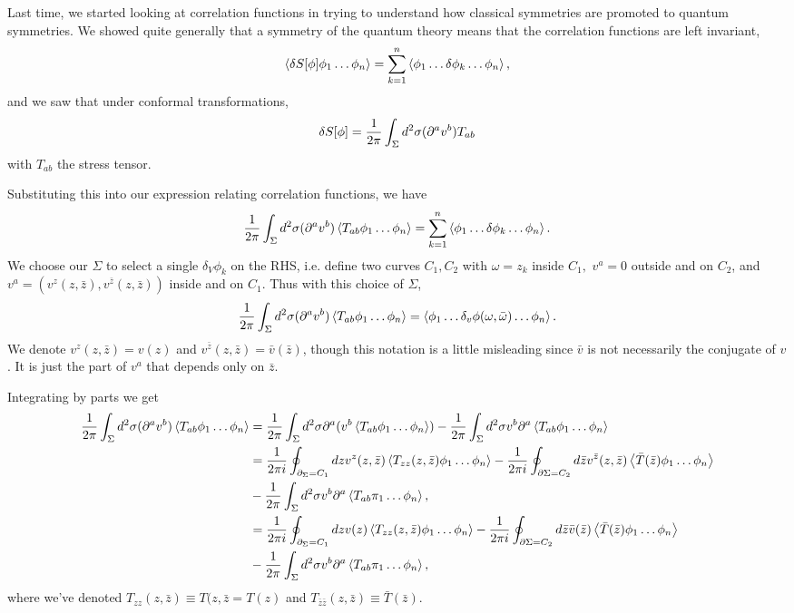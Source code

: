 Last time, we started looking at correlation functions in trying to understand how classical symmetries are promoted to quantum symmetries. We showed quite generally that a symmetry of the quantum theory means that the correlation functions are left invariant,
\begin{equation*}
    \left< \delta S[\phi]\phi_1\ldots \phi_n \right>=\sum_{k=1}^n \left< \phi_1 \ldots \delta \phi_k \ldots \phi_n \right>,
\end{equation*}
and we saw that under conformal transformations,
\begin{equation}
    \delta S[\phi]=\frac{1}{2\pi} \int_\Sigma d^2\sigma (\partial^a v^b)T_{ab}
\end{equation}
with $T_{ab}$ the stress tensor.

Substituting this into our expression relating correlation functions, we have
\begin{equation}
    \frac{1}{2\pi} \int_\Sigma d^2\sigma (\partial^a v^b) \left< T_{ab}\phi_1\ldots \phi_n \right>=\sum_{k=1}^n \left< \phi_1 \ldots \delta \phi_k \ldots \phi_n \right>.
\end{equation}
We choose our $\Sigma$ to select a single $\delta_V \phi_k$ on the RHS, i.e. define two curves $C_1,C_2$ with $\omega=z_k$ inside $C_1,$ $v^a=0$ outside and on $C_2$, and $v^a=(v^z(z,\bar z),v^{\bar z}(z,\bar z))$ inside and on $C_1.$ Thus with this choice of $\Sigma$,
\begin{equation}
    \frac{1}{2\pi} \int_\Sigma d^2\sigma (\partial^a v^b)\left< T_{ab} \phi_1 \ldots \phi_n \right>=\left< \phi_1 \ldots \delta_v \phi(\omega,\bar \omega)\ldots \phi_n \right>.
\end{equation}
We denote $v^z(z,\bar z)=v(z)$ and $v^{\bar z}(z,\bar z)=\bar v(\bar z)$, though this notation is a little misleading since $\bar v$ is not necessarily the conjugate of $v$. It is just the part of $v^a$ that depends only on $\bar z$.

Integrating by parts we get
\begin{align*}
    \frac{1}{2\pi} \int_\Sigma d^2\sigma (\partial^a v^b)\left< T_{ab} \phi_1 \ldots \phi_n \right>
        &=\frac{1}{2\pi} \int_\Sigma d^2\sigma \partial^a(v^b \left< T_{ab} \phi_1\ldots \phi_n \right>)-\frac{1}{2\pi}\int_\Sigma d^2\sigma v^b \partial^a \left< T_{ab} \phi_1 \ldots \phi_n \right>\\
        &= \frac{1}{2\pi i} \oint_{\partial_\Sigma=C_1} dz v^z (z,\bar z) \left< T_{zz}(z,\bar z) \phi_1\ldots \phi_n \right>
        -\frac{1}{2\pi i} \oint_{\partial\Sigma=C_2} d\bar z v^{\bar z} (z,\bar z)\left< \bar T(\bar z) \phi_1 \ldots \phi_n \right>\\
        &-\frac{1}{2\pi}\int_\Sigma d^2\sigma v^b \partial^a \left< T_{ab}\pi_1 \ldots \phi_n \right>,\\
        &= \frac{1}{2\pi i} \oint_{\partial_\Sigma=C_1} dz v(z) \left< T_{zz}(z,\bar z) \phi_1\ldots \phi_n \right>
        -\frac{1}{2\pi i} \oint_{\partial\Sigma=C_2} d\bar z \bar v (\bar z)\left< \bar T(\bar z) \phi_1 \ldots \phi_n \right>\\
        &-\frac{1}{2\pi}\int_\Sigma d^2\sigma v^b \partial^a \left< T_{ab}\pi_1 \ldots \phi_n \right>,\\
\end{align*}
where we've denoted $T_{zz}(z,\bar z)\equiv T(z,\bar z= T(z)$ and $T_{\bar z \bar z}(z,\bar z)\equiv \bar T (\bar z).$

